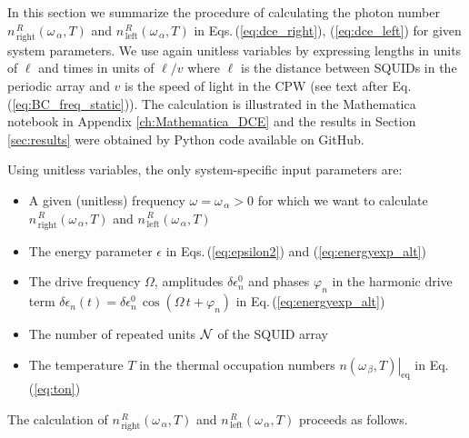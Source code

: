 \noindent
In this section we summarize the procedure of calculating the photon number 
$n_{\,\text{right}}^{\,R}(\omega_{\,\alpha}, T)$ and 
$n_{\,\text{left}}^{\,R}(\omega_{\,\alpha}, T)$ 
in Eqs.\,(\ref{eq:dce_right}), (\ref{eq:dce_left})
for given system parameters. 
We use again unitless variables 
by expressing lengths in units of $\ell$
and times in units of $\ell/v$ where $\ell$ is the distance between SQUIDs in the periodic array
and $v$ is the speed of light in the CPW (see text after Eq.\,(\ref{eq:BC_freq_static})). 
The calculation is illustrated in the
%
\color{red} 
Mathematica notebook in Appendix \ref{ch:Mathematica_DCE} and 
the results in Section \ref{sec:results} were obtained by Python code 
available on GitHub.
\color{blue}

\noindent
Using unitless variables, the only system-specific input parameters are:
%
\begin{itemize}
%
\item A given (unitless) frequency 
$\omega = \omega_{\,\alpha} > 0$ for which we want to calculate 
$n_{\,\text{right}}^{\,R}(\omega_{\,\alpha}, T)$ and 
$n_{\,\text{left}}^{\,R}(\omega_{\,\alpha}, T)$
%
\item The energy parameter $\epsilon$ in Eqs.\,(\ref{eq:epsilon2}) and (\ref{eq:energyexp_alt})
%
\item The drive frequency $\Omega$, amplitudes $\delta \epsilon_n^0$ and 
phases $\varphi_n$ in the harmonic drive term 
$\delta \epsilon_n(t) = \delta \epsilon_n^0 \, \cos(\Omega \, t + \varphi_n)$
in Eq.\,(\ref{eq:energyexp_alt})

\item The number of repeated units ${\cal N}$ of the SQUID array

\item The temperature $T$ in the thermal occupation numbers 
$\left. n(\omega_{\,\beta}, T) \right|_{\text{eq}}$ in Eq.\,(\ref{eq:ton})
%
\end{itemize}

\noindent
The calculation of 
$n_{\,\text{right}}^{\,R}(\omega_{\,\alpha}, T)$ and 
$n_{\,\text{left}}^{\,R}(\omega_{\,\alpha}, T)$ proceeds as follows. 

